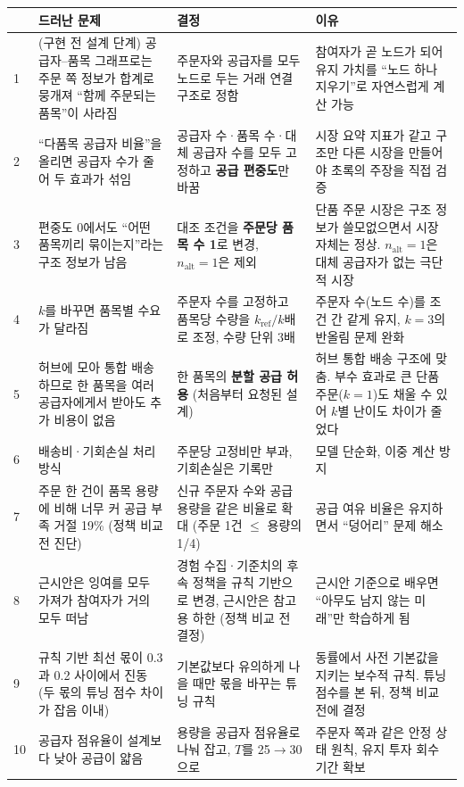 \documentclass[11pt,a4paper]{article}
\begin{document}
{\small
\begin{longtable}{p{0.5cm}p{4.4cm}p{4.6cm}p{4.9cm}}
\toprule
& 드러난 문제 & 결정 & 이유\\
\midrule
\endhead
1 & (구현 전 설계 단계) 공급자–품목 그래프로는 주문 쪽 정보가 합계로 뭉개져 ``함께 주문되는 품목''이 사라짐 &
주문자와 공급자를 모두 노드로 두는 거래 연결 구조로 정함 &
참여자가 곧 노드가 되어 유지 가치를 ``노드 하나 지우기''로 자연스럽게 계산 가능\\
2 & ``다품목 공급자 비율''을 올리면 공급자 수가 줄어 두 효과가 섞임 &
공급자 수·품목 수·대체 공급자 수를 모두 고정하고 \textbf{공급 편중도}만 바꿈 &
시장 요약 지표가 같고 구조만 다른 시장을 만들어야 초록의 주장을 직접 검증\\
3 & 편중도 0에서도 ``어떤 품목끼리 묶이는지''라는 구조 정보가 남음 &
대조 조건을 \textbf{주문당 품목 수 1}로 변경, $n_{\mathrm{alt}}=1$은 제외 &
단품 주문 시장은 구조 정보가 쓸모없으면서 시장 자체는 정상. $n_{\mathrm{alt}}=1$은 대체 공급자가 없는 극단적 시장\\
4 & $k$를 바꾸면 품목별 수요가 달라짐 &
주문자 수를 고정하고 품목당 수량을 $k_{\mathrm{ref}}/k$배로 조정, 수량 단위 3배 &
주문자 수(노드 수)를 조건 간 같게 유지, $k=3$의 반올림 문제 완화\\
5 & 허브에 모아 통합 배송하므로 한 품목을 여러 공급자에게서 받아도 추가 비용이 없음 &
한 품목의 \textbf{분할 공급 허용} (처음부터 요청된 설계) &
허브 통합 배송 구조에 맞춤. 부수 효과로 큰 단품 주문($k=1$)도 채울 수 있어 $k$별 난이도 차이가 줄었다\\
6 & 배송비·기회손실 처리 방식 &
주문당 고정비만 부과, 기회손실은 기록만 &
모델 단순화, 이중 계산 방지\\
7 & 주문 한 건이 품목 용량에 비해 너무 커 공급 부족 거절 19\% (정책 비교 전 진단) &
신규 주문자 수와 공급용량을 같은 비율로 확대 (주문 1건 $\le$ 용량의 1/4) &
공급 여유 비율은 유지하면서 ``덩어리'' 문제 해소\\
8 & 근시안은 잉여를 모두 가져가 참여자가 거의 모두 떠남 &
경험 수집·기준치의 후속 정책을 규칙 기반으로 변경, 근시안은 참고용 하한 (정책 비교 전 결정) &
근시안 기준으로 배우면 ``아무도 남지 않는 미래''만 학습하게 됨\\
9 & 규칙 기반 최선 몫이 0.3과 0.2 사이에서 진동 (두 몫의 튜닝 점수 차이가 잡음 이내) &
기본값보다 유의하게 나을 때만 몫을 바꾸는 튜닝 규칙 &
동률에서 사전 기본값을 지키는 보수적 규칙. 튜닝 점수를 본 뒤, 정책 비교 전에 결정\\
10 & 공급자 점유율이 설계보다 낮아 공급이 얇음 &
용량을 공급자 점유율로 나눠 잡고, $T$를 25$\to$30으로 &
주문자 쪽과 같은 안정 상태 원칙, 유지 투자 회수 기간 확보\\

\end{longtable}}
\end{document}

